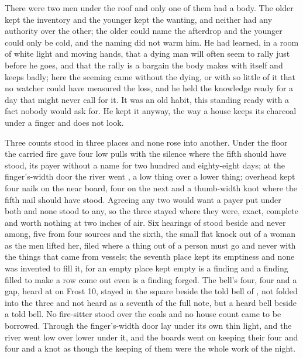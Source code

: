 There were two men under the roof and only one of them had a body. The older kept the inventory and the younger kept the wanting, and neither had any authority over the other; the older could name the afterdrop and the younger could only be cold, and the naming did not warm him. He had learned, in a room of white light and moving hands, that a dying man will often seem to rally just before he goes, and that the rally is a bargain the body makes with itself and keeps badly; here the seeming came without the dying, or with so little of it that no watcher could have measured the loss, and he held the knowledge ready for a day that might never call for it. It was an old habit, this standing ready with a fact nobody would ask for. He kept it anyway, the way a house keeps its charcoal under a finger and does not look.

\scenebreak

Three counts stood in three places and none rose into another. Under the floor the carried fire gave four low pulls with the silence where the fifth should have stood, its payer without a name for two hundred and eighty-eight days; at the finger's-width door the river went , a low thing over a lower thing; overhead  kept four nails on the near board, four on the next and a thumb-width knot where the fifth nail should have stood. Agreeing any two would want a payer put under both and none stood to any, so the three stayed where they were, exact, complete and worth nothing at two inches of air. Six hearings of  stood beside and never among, five from four sources and the sixth, the small flat knock out of a woman as the men lifted her, filed where a thing out of a person must go and never with the things that came from vessels; the seventh place kept its emptiness and none was invented to fill it, for an empty place kept empty is a finding and a finding filled to make a row come out even is a finding forged. The bell's four, four and a gap, heard at  on Frost 10, stayed in the square beside the told bell of , not folded into the three and not heard as a seventh of the full note, but a heard bell beside a told bell. No fire-sitter stood over the coals and no house count came to be borrowed. Through the finger's-width door  lay under its own thin light, and the river went low over lower under it, and the boards went on keeping their four and four and a knot as though the keeping of them were the whole work of the night.

